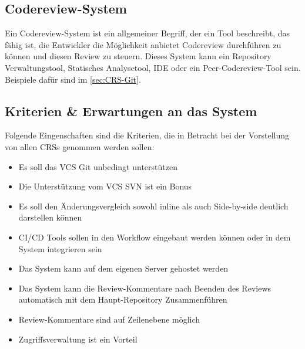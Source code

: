 \subsection{Codereview-System}
\label{subsec:CRS}

Ein Codereview-System ist ein allgemeiner Begriff, der ein Tool beschreibt, das fähig ist, die Entwickler die Möglichkeit anbietet Codereview durchführen zu können und diesen Review zu steuern. Dieses System kann ein Repository Verwaltungstool, Statisches Analysetool, IDE oder ein Peer-Codereview-Tool sein. Beispiele dafür sind im \cref{sec:CRS-Git}.

\subsection{Kriterien \& Erwartungen an das System}
\label{sec:kriterien}

Folgende Eingenschaften sind die Kriterien, die in Betracht bei der Vorstellung von allen \acp{CRS} genommen werden sollen:

\begin{itemize}
	\item Es soll das \ac{VCS} Git unbedingt unterstützen
	\item Die Unterstützung vom \ac{VCS} \ac{SVN} ist ein Bonus
	\item Es soll den Änderungsvergleich sowohl inline als auch Side-by-side deutlich darstellen können
	\item \ac{CI}/\ac{CD} Tools sollen in den Workflow eingebaut werden können oder in dem System integrieren sein
	\item Das System kann auf dem eigenen Server gehostet werden
	\item Das System kann die Review-Kommentare nach Beenden des Reviews automatisch mit dem Haupt-Repository Zusammenführen
	\item Review-Kommentare sind auf Zeilenebene möglich
	\item Zugriffsverwaltung ist ein Vorteil
\end{itemize}
